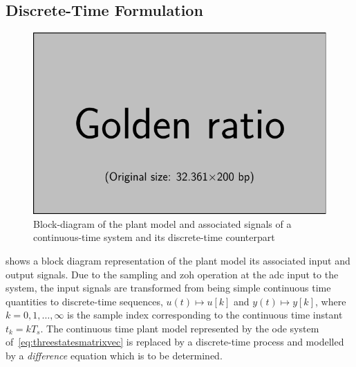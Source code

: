 \subsection{Discrete-Time  Formulation}

\begin{figure}[htb]
    \centering
    \includegraphics{placeholder_images/example-image-golden.pdf}
    \caption[Block-diagram of continuous and discrete-time systems]{Block-diagram of the plant model and associated signals of a continuous-time system and its discrete-time counterpart}
    \label{fig:blockdiagctsdisc}
\end{figure}

 shows  a block  diagram representation of  the plant
model its associated input and output signals. Due to the sampling and \gls{zoh}
operation  at  the  \gls{adc}  input  to  the  system,  the  input  signals  are
transformed  from  being  simple  continuous time  quantities  to  discrete-time
sequences,  \ie{} $u(t)  \mapsto  u[k]$  and $y(t)  \mapsto  y[k]$,  where $k  =
0,1,\dots,∞$ is the sample index  corresponding to the continuous time instant
$t_k  = kT_s$.  The continuous  time plant  model represented  by the  \gls{ode}
system of~\cref{eq:threestatesmatrixvec} is replaced  by a discrete-time process
and modelled by a \emph{difference} equation which is to be determined.

